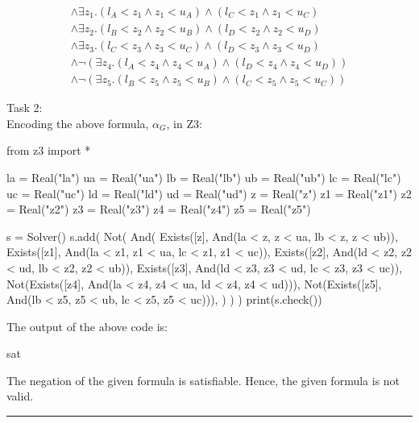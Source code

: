 \documentclass[12pt,letterpaper, onecolumn]{exam}
\begin{document}
\begin{questions}
\begin{align*}
		\land \exists z_1. (l_{A} < z_1 \land z_1 < u_{A}) \land (l_{C} < z_1 \land z_1 < u_{C}) \\
		\land \exists z_2. (l_{B} < z_2 \land z_2 < u_{B}) \land (l_{D} < z_2 \land z_2 < u_{D}) \\
		\land \exists z_3. (l_{C} < z_3 \land z_3 < u_{C}) \land (l_{D} < z_3 \land z_3 < u_{D}) \\
		\land \neg (\exists z_4. (l_{A} < z_4 \land z_4 < u_{A}) \land (l_{D} < z_4 \land z_4 < u_{D})) \\
		\land \neg (\exists z_5. (l_{B} < z_5 \land z_5 < u_{B}) \land (l_{C} < z_5 \land z_5 < u_{C}))
	\end{align*}
	
	Task 2: \\
	Encoding the above formula, $\alpha_G$, in Z3:
	\begin{python}
from z3 import *

la = Real("la")
ua = Real("ua")
lb = Real("lb")
ub = Real("ub")
lc = Real("lc")
uc = Real("uc")
ld = Real("ld")
ud = Real("ud")
z = Real("z")
z1 = Real("z1")
z2 = Real("z2")
z3 = Real("z3")
z4 = Real("z4")
z5 = Real("z5")

s = Solver()
s.add(
	Not(
		And(
			Exists([z], And(la < z, z < ua, lb < z, z < ub)),
			Exists([z1], And(la < z1, z1 < ua, lc < z1, z1 < uc)),
			Exists([z2], And(ld < z2, z2 < ud, lb < z2, z2 < ub)),
			Exists([z3], And(ld < z3, z3 < ud, lc < z3, z3 < uc)),
			Not(Exists([z4], And(la < z4, z4 < ua, ld < z4, z4 < ud))),
			Not(Exists([z5], And(lb < z5, z5 < ub, lc < z5, z5 < uc))),
		)
	)
)
print(s.check())
	\end{python}
	The output of the above code is:
	\begin{python}
sat
	\end{python}
	The negation of the given formula is satisfiable. Hence, the given formula is not valid. \\

    {\rule{17cm}{0.4pt}}
	\question[]
	\solutiontitle


\end{questions}
\end{document}
